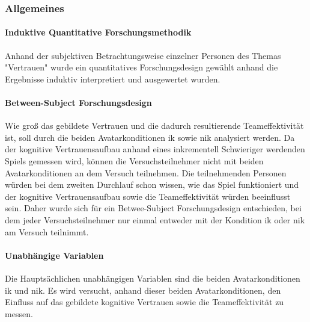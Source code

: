 \documentclass[a4paper,11pt]{article}%
\renewcommand{\\}{\vspace*{0.5\baselineskip} \newline}
\begin{document}
%
%			
%	

\subsubsection{Allgemeines}
			\paragraph{Induktive Quantitative Forschungsmethodik}
				Anhand der subjektiven Betrachtungsweise einzelner Personen des Themas "Vertrauen" wurde ein quantitatives Forschungsdesign gewählt anhand die Ergebnisse induktiv interpretiert und ausgewertet wurden.
			\paragraph{Between-Subject Forschungsdesign}
Wie groß das gebildete Vertrauen und die dadurch resultierende Teameffektivität ist, soll durch die beiden Avatarkonditionen \ac{ik} sowie \ac{nik} analysiert werden. Da der kognitive Vertrauensaufbau anhand eines inkrementell Schwieriger werdenden Spiels gemessen wird, können die Versuchsteilnehmer nicht mit beiden Avatarkonditionen an dem Versuch teilnehmen. Die teilnehmenden Personen würden bei dem zweiten Durchlauf schon wissen, wie das Spiel funktioniert und der kognitive Vertrauensaufbau sowie die Teameffektivität würden beeinflusst sein. Daher wurde sich für ein Betwee-Subject Forschungsdesign entschieden, bei dem jeder Versuchsteilnehmer nur einmal entweder mit der Kondition \ac{ik} oder \ac{nik} am Versuch teilnimmt.
			\paragraph{Unabhängige Variablen}
Die Hauptsächlichen unabhängigen Variablen sind die beiden Avatarkonditionen \ac{ik} und \ac{nik}. Es wird versucht, anhand dieser beiden Avatarkonditionen, den Einfluss auf das gebildete kognitive Vertrauen sowie die Teameffektivität zu messen.
\end{document}
